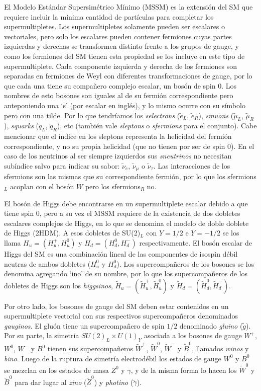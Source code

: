 El Modelo Estándar Supersimétrico Mínimo (MSSM) es la extensión del SM que requiere incluir la mínima cantidad de partículas para completar los supermultipletes. Los supermultipletes solamente pueden ser escalares o vectoriales, pero solo los escalares pueden contener fermiones cuyas partes izquierdas y derechas se transformen distinto frente a los grupos de gauge, y como los fermiones del SM tienen esta propiedad se los incluye en este tipo de supermultiplete. Cada componente izquierda y derecha de los fermiones son separadas en fermiones de Weyl con diferentes transformaciones de gauge, por lo que cada una tiene su compañero complejo escalar, un bosón de spin 0. Los nombres de esto bosones son iguales al de su fermión correspondiente pero anteponiendo una `s' (por escalar en inglés), y lo mismo ocurre con su símbolo pero con una tilde. Por lo que tendríamos los \textit{selectrons} ($\tilde{e}_L$, $\tilde{e}_R$), \textit{smuons} ($\tilde{\mu}_L$, $\tilde{\mu}_R$), \textit{squarks} ($\tilde{q}_L$, $\tilde{q}_R$), etc (también vale \textit{sleptons} o \textit{sfermions} para el conjunto). Cabe mencionar que el índice en los sleptons representa la helicidad del fermión correspondiente, y no su propia helicidad (que no tienen por ser de spin 0). En el caso de los neutrinos al ser siempre izquierdos sus \textit{sneutrinos} no necesitan subíndice salvo para indicar su sabor: $\tilde{\nu}_e$, $\tilde{\nu}_{\mu}$ o $\tilde{\nu}_{\tau}$. Las interacciones de los sfermions son las mismas que su correspondiente fermión, por lo que los sfermions$_L$ acoplan con el bosón $W$ pero los sfermions$_R$ no.

El bosón de Higgs debe encontrarse en un supermultiplete escalar debido a que tiene spin 0, pero a su vez el MSSM requiere de la existencia de dos dobletes escalares complejos de Higgs, en lo que se denomina el modelo de doble doblete de Higgs (2HDM). A esos dobletes de SU(2)$_L$ con $Y=1/2$ e $Y=-1/2$ se los llama $H_u=(H_u^+, H_u^0)$ y $H_d=(H_d^0, H_d^-)$ respectivamente. El bosón escalar de Higgs del SM es una combinación lineal de las componentes de isospin débil neutras de ambos dobletes ($H_u^0$ y $H_d^0$). Los supercompañeros de los bosones se los denomina agregando `ino' de su nombre, por lo que los supercompañeros de los dobletes de Higgs son los \textit{higgsinos}, $\widetilde{H}_u=(\widetilde{H}_u^+, \widetilde{H}_u^0)$ y $\widetilde{H}_d=(\widetilde{H}_d^0, \widetilde{H}_d^-)$.

Por otro lado, los bosones de gauge del SM deben estar contenidos en un supermultiplete vectorial con sus respectivos supercompañeros denominados \textit{gauginos}. El gluón tiene un supercompañero de spin $1/2$ denominado \textit{gluino} ($\tilde{g}$). Por su parte, la simetría $SU(2)_L\times U(1)_Y$ asociada a los bosones de gauge $W^+$, $W^0$, $W^-$ y $B^0$ tienen sus supercompañeros $\widetilde{W}^+$, $\widetilde{W}^0$, $\widetilde{W}^-$ y $\tilde{B}^0$, llamados \textit{winos} y \textit{bino}. Luego de la ruptura de simetría electrodébil los estados de gauge $W^0$ y $B^0$ se mezclan en los estados de masa $Z^0$ y $\gamma$, y de la misma forma lo hacen los $\widetilde{W}^0$ y $\widetilde{B}^0$ para dar lugar al \textit{zino} ($\widetilde{Z}^0$) y \textit{photino} ($\tilde{\gamma}$).

